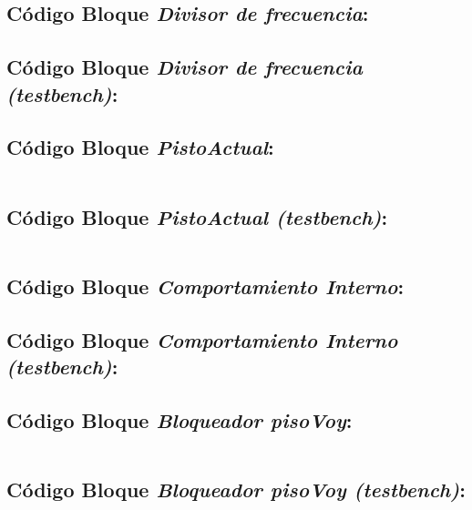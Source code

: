\subsection{Código Bloque \textit{Divisor de frecuencia}:} \label{code:DivisorFrecuencia}

\subsection{Código Bloque \textit{Divisor de frecuencia (testbench)}:} \label{code:DivisorFrecuencia_Tb}

\subsection{Código Bloque \textit{PistoActual}:} \label{code:PisoActual}
    \inputminted[frame=lines,fontsize=\footnotesize,linenos]{vhdl}{CodeFiles/PisoActual.vhd}
    
\subsection{Código Bloque \textit{PistoActual (testbench)}:} \label{code:PisoActual_tb}
    \inputminted[frame=lines,fontsize=\footnotesize,linenos]{vhdl}{CodeFiles/PisoActual_tb.vhd}
    
\subsection{Código Bloque \textit{Comportamiento Interno}:} \label{code:ComportamientoInterno}

\subsection{Código Bloque \textit{Comportamiento Interno (testbench)}:} \label{code:ComportamientoInterno_tb}

\subsection{Código Bloque \textit{Bloqueador pisoVoy}:} \label{code:BloqueadorpisoVoy}	
    \inputminted[frame=lines,fontsize=\footnotesize,linenos]{vhdl}{CodeFiles/BloqueadorpisoVoy.vhd}

\subsection{Código Bloque \textit{Bloqueador pisoVoy (testbench)}:} \label{code:BloqueadorpisoVoy_tb}
    \inputminted[frame=lines,fontsize=\footnotesize,linenos]{vhdl}{CodeFiles/BloqueadorpisoVoy_tb.vhd}

